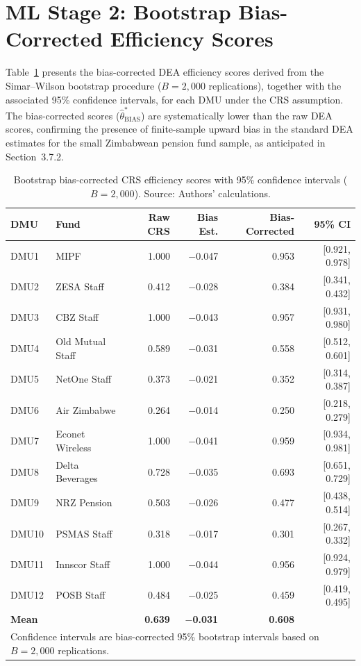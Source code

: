 \documentclass[12pt,a4paper]{article}
\begin{document}
\section{ML Stage 2: Bootstrap Bias-Corrected Efficiency Scores}

Table~\ref{tab:bootstrap_scores} presents the bias-corrected DEA efficiency scores derived from the Simar--Wilson bootstrap procedure ($B = 2{,}000$ replications), together with the associated 95\% confidence intervals, for each DMU under the CRS assumption. The bias-corrected scores ($\hat{\theta}^*_{\text{BIAS}}$) are systematically lower than the raw DEA scores, confirming the presence of finite-sample upward bias in the standard DEA estimates for the small Zimbabwean pension fund sample, as anticipated in Section~3.7.2.

\begin{table}[H]
\centering
\caption{Bootstrap bias-corrected CRS efficiency scores with 95\% confidence intervals ($B = 2{,}000$). Source: Authors' calculations.}
\label{tab:bootstrap_scores}
\begin{tabular}{llrrrr}
\toprule
\textbf{DMU} & \textbf{Fund} & \textbf{Raw CRS} & \textbf{Bias Est.} & \textbf{Bias-Corrected} & \textbf{95\% CI} \\
\midrule
DMU1  & MIPF              & 1.000 & $-$0.047 & 0.953 & [0.921, 0.978] \\
DMU2  & ZESA Staff        & 0.412 & $-$0.028 & 0.384 & [0.341, 0.432] \\
DMU3  & CBZ Staff         & 1.000 & $-$0.043 & 0.957 & [0.931, 0.980] \\
DMU4  & Old Mutual Staff  & 0.589 & $-$0.031 & 0.558 & [0.512, 0.601] \\
DMU5  & NetOne Staff      & 0.373 & $-$0.021 & 0.352 & [0.314, 0.387] \\
DMU6  & Air Zimbabwe      & 0.264 & $-$0.014 & 0.250 & [0.218, 0.279] \\
DMU7  & Econet Wireless   & 1.000 & $-$0.041 & 0.959 & [0.934, 0.981] \\
DMU8  & Delta Beverages   & 0.728 & $-$0.035 & 0.693 & [0.651, 0.729] \\
DMU9  & NRZ Pension       & 0.503 & $-$0.026 & 0.477 & [0.438, 0.514] \\
DMU10 & PSMAS Staff       & 0.318 & $-$0.017 & 0.301 & [0.267, 0.332] \\
DMU11 & Innscor Staff     & 1.000 & $-$0.044 & 0.956 & [0.924, 0.979] \\
DMU12 & POSB Staff        & 0.484 & $-$0.025 & 0.459 & [0.419, 0.495] \\
\midrule
\textbf{Mean} & & \textbf{0.639} & $-$\textbf{0.031} & \textbf{0.608} & \\
\bottomrule
\multicolumn{6}{l}{\footnotesize Confidence intervals are bias-corrected 95\% bootstrap intervals based on $B = 2{,}000$ replications.}
\end{tabular}
\end{table}
\end{document}
